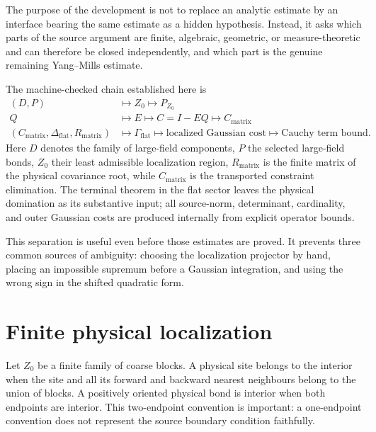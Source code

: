 \documentclass[11pt,a4paper]{article}
\theoremstyle{definition}
\begin{document}
The purpose of the development is not to replace an analytic estimate by an
interface bearing the same estimate as a hidden hypothesis.  Instead, it
asks which parts of the source argument are finite, algebraic, geometric, or
measure-theoretic and can therefore be closed independently, and which part
is the genuine remaining Yang--Mills estimate.

The machine-checked chain established here is
\begin{equation}\label{eq:chain}
\begin{aligned}
 (D,P)&\longmapsto Z_0\longmapsto P_{Z_0}
 \\[-1mm]
 Q&\longmapsto E\longmapsto C=I-EQ
 \longmapsto C_{\mathrm{matrix}}\\
 (C_{\mathrm{matrix}},\Delta_{\mathrm{flat}},R_{\mathrm{matrix}})
 &\longmapsto \Gamma_{\mathrm{flat}}
 \longmapsto \text{localized Gaussian cost}
 \longmapsto \text{Cauchy term bound}.
\end{aligned}
\end{equation}
Here $D$ denotes the family of large-field components, $P$ the selected
large-field bonds, $Z_0$ their least admissible localization region,
$R_{\mathrm{matrix}}$ is the finite matrix of the physical covariance root,
while $C_{\mathrm{matrix}}$ is the transported constraint elimination.  The
terminal theorem in the flat sector leaves the physical domination as its
substantive input; all source-norm, determinant, cardinality, and outer
Gaussian costs are produced internally from explicit operator bounds.

This separation is useful even before those estimates are proved.  It prevents
three common sources of ambiguity: choosing the localization projector by
hand, placing an impossible supremum before a Gaussian integration, and using
the wrong sign in the shifted quadratic form.

\section{Finite physical localization}

Let $Z_0$ be a finite family of coarse blocks.  A physical site belongs to the
interior when the site and all its forward and backward nearest neighbours
belong to the union of blocks.  A positively oriented physical bond is
interior when both endpoints are interior.  This two-endpoint convention is
important: a one-endpoint convention does not represent the source boundary
condition faithfully.
\end{document}
